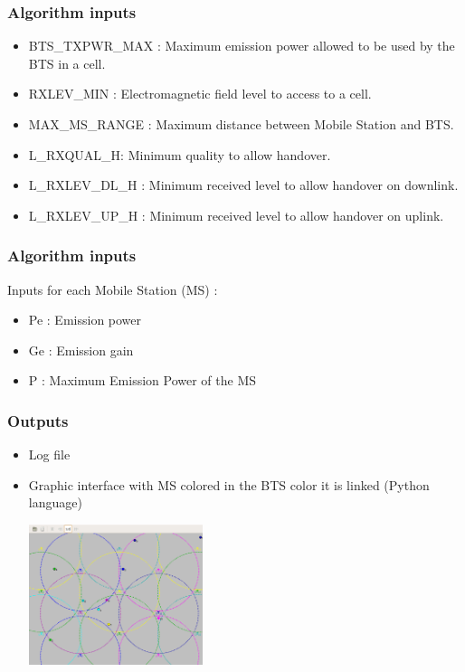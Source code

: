 \documentclass{beamer}
\begin{document}
\begin{frame}
\frametitle{Algorithm inputs}

\begin{itemize}
  \item BTS\_TXPWR\_MAX : Maximum emission power allowed to be used by the BTS in a cell.
  \item RXLEV\_MIN : Electromagnetic field level to access to a cell.
  \item MAX\_MS\_RANGE : Maximum distance between Mobile Station and BTS.
  \item L\_RXQUAL\_H: Minimum quality to allow handover.
  \item L\_RXLEV\_DL\_H : Minimum received level to allow handover on downlink.
  \item L\_RXLEV\_UP\_H : Minimum received level to allow handover on uplink.
\end{itemize}
\end{frame}

\begin{frame}
\frametitle{Algorithm inputs}

Inputs for each Mobile Station (MS) :
\begin{itemize}
  \item Pe : Emission power
  \item Ge : Emission gain
  \item P : Maximum Emission Power of the MS
\end{itemize}

\end{frame}
\begin{frame}
\frametitle{Outputs}

\begin{itemize}
    \item Log file
    \item Graphic interface with MS colored in the BTS color it is linked
(Python language)
      \begin{center}
        \includegraphics[width=0.4\textwidth]{./images/capture.png}
      \end{center}
\end{itemize}

\end{frame}
\end{document}
